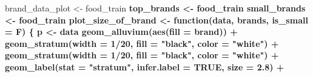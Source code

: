 \documentclass[
]{article}
\newenvironment{Shaded}{\begin{snugshade}}{\end{snugshade}}
\newcommand{\ControlFlowTok}[1]{\textcolor[rgb]{0.13,0.29,0.53}{\textbf{#1}}}
\newcommand{\DataTypeTok}[1]{\textcolor[rgb]{0.13,0.29,0.53}{#1}}
\newcommand{\DecValTok}[1]{\textcolor[rgb]{0.00,0.00,0.81}{#1}}
\newcommand{\FloatTok}[1]{\textcolor[rgb]{0.00,0.00,0.81}{#1}}
\newcommand{\KeywordTok}[1]{\textcolor[rgb]{0.13,0.29,0.53}{\textbf{#1}}}
\newcommand{\NormalTok}[1]{#1}
\newcommand{\OperatorTok}[1]{\textcolor[rgb]{0.81,0.36,0.00}{\textbf{#1}}}
\newcommand{\OtherTok}[1]{\textcolor[rgb]{0.56,0.35,0.01}{#1}}
\newcommand{\StringTok}[1]{\textcolor[rgb]{0.31,0.60,0.02}{#1}}
\begin{document}
\begin{Shaded}
\begin{Highlighting}[]
\NormalTok{brand_data_plot <-}\StringTok{ }\NormalTok{food_train }\OperatorTok{%>%}\StringTok{ }\KeywordTok{group_by}\NormalTok{(category, brand) }\OperatorTok{%>%}\StringTok{ }\KeywordTok{summarise}\NormalTok{(}\DataTypeTok{n=}\KeywordTok{n}\NormalTok{()) }\OperatorTok{%>%}\StringTok{ }\KeywordTok{arrange}\NormalTok{(}\OperatorTok{-}\NormalTok{n) }
\NormalTok{top_brands <-}\StringTok{ }\NormalTok{food_train }\OperatorTok{%>%}\StringTok{ }\KeywordTok{group_by}\NormalTok{(brand) }\OperatorTok{%>%}\StringTok{ }\KeywordTok{count}\NormalTok{(}\DataTypeTok{sort=}\OtherTok{TRUE}\NormalTok{) }\OperatorTok{%>%}\StringTok{ }\KeywordTok{head}\NormalTok{(}\DecValTok{10}\NormalTok{) }\OperatorTok{%>%}\StringTok{ }\KeywordTok{pull}\NormalTok{(brand)}
\NormalTok{small_brands <-}\StringTok{ }\NormalTok{food_train }\OperatorTok{%>%}\StringTok{ }\KeywordTok{group_by}\NormalTok{(brand) }\OperatorTok{%>%}\StringTok{ }\KeywordTok{count}\NormalTok{(}\DataTypeTok{sort=}\OtherTok{TRUE}\NormalTok{) }\OperatorTok{%>%}\StringTok{ }\KeywordTok{filter}\NormalTok{(n}\OperatorTok{<}\DecValTok{10}\NormalTok{) }\OperatorTok{%>%}\StringTok{  }\KeywordTok{pull}\NormalTok{(brand)}
\NormalTok{plot_size_of_brand <-}\StringTok{ }\ControlFlowTok{function}\NormalTok{(data, brands, }\DataTypeTok{is_small =}\NormalTok{ F) \{}
\NormalTok{  p <-}\StringTok{ }\NormalTok{data }\OperatorTok{%>%}\StringTok{ }\KeywordTok{filter}\NormalTok{(brand }\OperatorTok{%in%}\StringTok{ }\NormalTok{brands) }\OperatorTok{%>%}\StringTok{ }\KeywordTok{ggplot}\NormalTok{(}\KeywordTok{aes}\NormalTok{(}\DataTypeTok{y =}\NormalTok{ n, }\DataTypeTok{axis1 =}\NormalTok{ brand, }\DataTypeTok{axis2 =}\NormalTok{ category)) }\OperatorTok{+}
\StringTok{     }\KeywordTok{geom_alluvium}\NormalTok{(}\KeywordTok{aes}\NormalTok{(}\DataTypeTok{fill =}\NormalTok{ brand)) }\OperatorTok{+}\StringTok{  }\KeywordTok{geom_stratum}\NormalTok{(}\DataTypeTok{width =} \DecValTok{1}\OperatorTok{/}\DecValTok{20}\NormalTok{, }\DataTypeTok{fill =} \StringTok{"black"}\NormalTok{, }\DataTypeTok{color =} \StringTok{"white"}\NormalTok{) }\OperatorTok{+}
\StringTok{     }\KeywordTok{geom_stratum}\NormalTok{(}\DataTypeTok{width =} \DecValTok{1}\OperatorTok{/}\DecValTok{20}\NormalTok{, }\DataTypeTok{fill =} \StringTok{"black"}\NormalTok{, }\DataTypeTok{color =} \StringTok{"white"}\NormalTok{) }\OperatorTok{+}\StringTok{ }
\StringTok{     }\KeywordTok{geom_label}\NormalTok{(}\DataTypeTok{stat =} \StringTok{"stratum"}\NormalTok{, }\DataTypeTok{infer.label =} \OtherTok{TRUE}\NormalTok{, }\DataTypeTok{size =} \FloatTok{2.8}\NormalTok{) }\OperatorTok{+}\StringTok{ }
}}}}
\end{Highlighting}
\end{Shaded}
\end{document}
